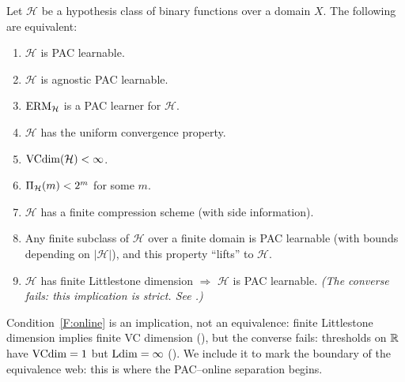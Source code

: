 \begin{thm}
\label{thm:fundamental}
Let $\mathcal{H}$ be a hypothesis class of binary functions over a domain $X$.
The following are equivalent:
\begin{enumerate}[label=\textnormal{(F\arabic*)}]
\item \label{F:pac} $\mathcal{H}$ is PAC learnable.
\item \label{F:agpac} $\mathcal{H}$ is agnostic PAC learnable.
\item \label{F:erm} $\mathrm{ERM}_\mathcal{H}$ is a PAC learner for $\mathcal{H}$.
\item \label{F:uc} $\mathcal{H}$ has the uniform convergence property.
\item \label{F:finvc} $\mathrm{VCdim}(\mathcal{H}) < \infty$.
\item \label{F:fingrowth} $\Pi_\mathcal{H}(m) < 2^m$ for some $m$.
\item \label{F:compression} $\mathcal{H}$ has a finite compression scheme (with side information).
\item \label{F:finiteness} Any finite subclass of $\mathcal{H}$ over a
  finite domain is PAC learnable (with bounds depending on $|\mathcal{H}|$),
  and this property ``lifts'' to $\mathcal{H}$.
\item \label{F:online} $\mathcal{H}$ has finite Littlestone dimension
  $\Longrightarrow$ $\mathcal{H}$ is PAC learnable. \emph{(The converse fails:
  this implication is strict.  See .)}
\end{enumerate}
\end{thm}

\begin{remark}
\label{rmk:numbering}
Condition~\ref{F:online} is an implication, not an equivalence: finite
Littlestone dimension implies finite VC dimension (), but
the converse fails: thresholds on $\mathbb{R}$ have $\mathrm{VCdim} = 1$ but $\mathrm{Ldim} = \infty$
().  We include it to mark the boundary of the
equivalence web: this is where the PAC--online separation begins.
\end{remark}

